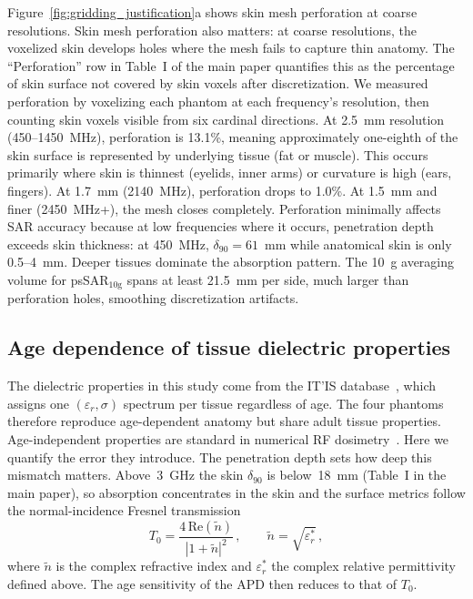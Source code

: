 \documentclass{iopjournal}
\begin{document}
Figure~\ref{fig:gridding_justification}a shows skin mesh perforation at coarse resolutions.
Skin mesh perforation also matters: at coarse resolutions, the voxelized skin develops holes where the mesh fails to capture thin anatomy.
The ``Perforation'' row in Table~I of the main paper quantifies this as the percentage of skin surface not covered by skin voxels after discretization.
We measured perforation by voxelizing each phantom at each frequency's resolution, then counting skin voxels visible from six cardinal directions.
At 2.5~mm resolution (450--1450~MHz), perforation is 13.1\%, meaning approximately one-eighth of the skin surface is represented by underlying tissue (fat or muscle).
This occurs primarily where skin is thinnest (eyelids, inner arms) or curvature is high (ears, fingers).
At 1.7~mm (2140~MHz), perforation drops to 1.0\%. At 1.5~mm and finer (2450~MHz+), the mesh closes completely.
Perforation minimally affects \gls{SAR} accuracy because at low frequencies where it occurs, penetration depth exceeds skin thickness: at 450~MHz, $\delta_{90} = 61$~mm while anatomical skin is only 0.5--4~mm.
Deeper tissues dominate the absorption pattern.
The 10~g averaging volume for psSAR$_{10\mathrm{g}}$ spans at least 21.5~mm per side, much larger than perforation holes, smoothing discretization artifacts.

\subsection{Age dependence of tissue dielectric properties}
\label{si:age}

The dielectric properties in this study come from the IT'IS database~\citep{itis_database}, which assigns one $(\varepsilon_r,\sigma)$ spectrum per tissue regardless of age.
The four phantoms therefore reproduce age-dependent anatomy but share adult tissue properties.
Age-independent properties are standard in numerical RF dosimetry~\citep{bakker2010children,kuehn2009assessment,gosselin2014development,hirata2021review}.
Here we quantify the error they introduce.
The penetration depth sets how deep this mismatch matters.
Above~3~GHz the skin $\delta_{90}$ is below~18~mm (Table~I in the main paper), so absorption concentrates in the skin and the surface metrics follow the normal-incidence Fresnel transmission
\begin{equation}\label{eq:T0}
T_0 = \frac{4\,\mathrm{Re}(\tilde{n})}{|1+\tilde{n}|^2} \,, \qquad \tilde{n} = \sqrt{\varepsilon_r^*} \,,
\end{equation}
where $\tilde{n}$ is the complex refractive index and $\varepsilon_r^*$ the complex relative permittivity defined above.
The age sensitivity of the \gls{APD} then reduces to that of $T_0$.
\end{document}
